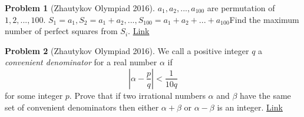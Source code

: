 \documentclass[]{article}
\theoremstyle{definition}
\newtheorem{problem}{Problem}
\begin{document}
\begin{problem}[Zhautykov Olympiad 2016]
	$a_1,a_2,...,a_{100}$ are permutation of $1,2,...,100$. $S_1=a_1, S_2=a_1+a_2,...,S_{100}=a_1+a_2+...+a_{100}$Find the maximum number of perfect squares from $S_i$. \hfill \href{http://artofproblemsolving.com/community/c6h1185316p5756328}{Link}
\end{problem}




\begin{problem}[Zhautykov Olympiad 2016]
	We call a positive integer $q$ a \textit{convenient denominator} for a real number $\alpha$ if
	$$\displaystyle |\alpha - \dfrac{p}{q}|<\dfrac{1}{10q}$$ for some integer $p$. Prove that if two irrational numbers $\alpha$ and
	$\beta$ have the same set of convenient denominators then either $\alpha+\beta$ or $\alpha- \beta$ is an integer. \hfill \href{http://artofproblemsolving.com/community/c6h1185684p5759537}{Link}
\end{problem}
\end{document}
